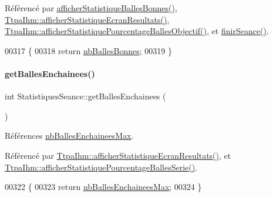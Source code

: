 Référencé par \hyperlink{class_statistiques_seance_a712aad34b7ff7dd550ac6c976f75f416}{afficher\+Statistique\+Balles\+Bonnes()}, \hyperlink{class_ttpa_ihm_aa480a02532144d0f99af027b5b201ae1}{Ttpa\+Ihm\+::afficher\+Statistique\+Ecran\+Resultats()}, \hyperlink{class_ttpa_ihm_ac37d57d13301cda22f062219de8731c4}{Ttpa\+Ihm\+::afficher\+Statistique\+Pourcentage\+Balles\+Objectif()}, et \hyperlink{class_statistiques_seance_a72526ea18d6c534a1cb84576ef3ea28d}{finir\+Seance()}.


\begin{DoxyCode}
00317 \{
00318     \textcolor{keywordflow}{return} \hyperlink{class_statistiques_seance_af62043be598fd6b7cd7ddbc37eadf967}{nbBallesBonnes};
00319 \}
\end{DoxyCode}
\mbox{\label{class_statistiques_seance_a1f241d7ef584ebffa2246134c63be53b}} 
\paragraph{\texorpdfstring{get\+Balles\+Enchainees()}{getBallesEnchainees()}}
{\footnotesize\ttfamily int Statistiques\+Seance\+::get\+Balles\+Enchainees (\begin{DoxyParamCaption}{ }\end{DoxyParamCaption})}



Références \hyperlink{class_statistiques_seance_a3e64397e87d453efb42b2545df1a8e90}{nb\+Balles\+Enchainees\+Max}.



Référencé par \hyperlink{class_ttpa_ihm_aa480a02532144d0f99af027b5b201ae1}{Ttpa\+Ihm\+::afficher\+Statistique\+Ecran\+Resultats()}, et \hyperlink{class_ttpa_ihm_aec988dc2398578eb8e91563d1ba58cde}{Ttpa\+Ihm\+::afficher\+Statistique\+Pourcentage\+Balles\+Serie()}.


\begin{DoxyCode}
00322 \{
00323     \textcolor{keywordflow}{return} \hyperlink{class_statistiques_seance_a3e64397e87d453efb42b2545df1a8e90}{nbBallesEnchaineesMax};
00324 \}
\end{DoxyCode}
\mbox{\label{class_statistiques_seance_a26b717d40065e7afd80465458f3cb6aa}} 
